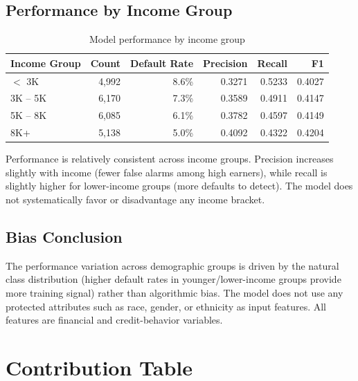 \documentclass[12pt, a4paper]{article}
\begin{document}
\subsection{Performance by Income Group}

\begin{table}[H]
\centering
\begin{tabular}{lrrrrr}
\toprule
\textbf{Income Group} & \textbf{Count} & \textbf{Default Rate} & \textbf{Precision} & \textbf{Recall} & \textbf{F1} \\
\midrule
$<$ 3K & 4,992 & 8.6\% & 0.3271 & 0.5233 & 0.4027 \\
3K -- 5K & 6,170 & 7.3\% & 0.3589 & 0.4911 & 0.4147 \\
5K -- 8K & 6,085 & 6.1\% & 0.3782 & 0.4597 & 0.4149 \\
8K+ & 5,138 & 5.0\% & 0.4092 & 0.4322 & 0.4204 \\
\bottomrule
\end{tabular}
\caption{Model performance by income group}
\end{table}

Performance is relatively consistent across income groups. Precision increases slightly with income (fewer false alarms among high earners), while recall is slightly higher for lower-income groups (more defaults to detect). The model does not systematically favor or disadvantage any income bracket.

\subsection{Bias Conclusion}

The performance variation across demographic groups is driven by the natural class distribution (higher default rates in younger/lower-income groups provide more training signal) rather than algorithmic bias. The model does not use any protected attributes such as race, gender, or ethnicity as input features. All features are financial and credit-behavior variables.

\newpage

\section{Contribution Table}
\end{document}
